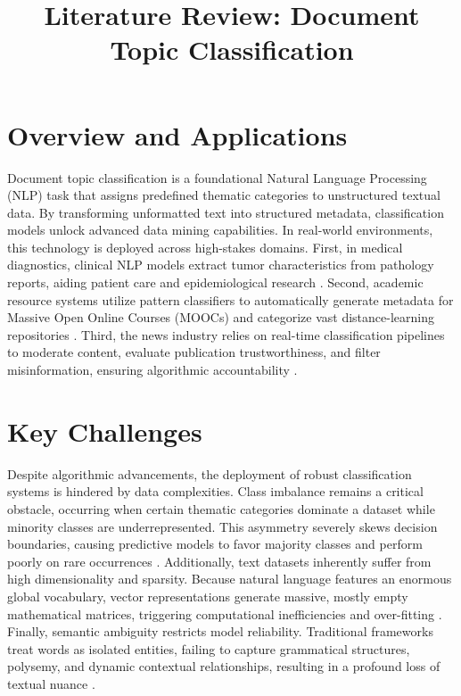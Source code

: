 \documentclass[11pt,a4paper]{article}
\title{Literature Review: Document Topic Classification}
\author{}
\date{}
\begin{document}
\maketitle

\section*{Overview and Applications}

Document topic classification is a foundational Natural Language Processing (NLP) task that assigns predefined thematic categories to unstructured textual data. By transforming unformatted text into structured metadata, classification models unlock advanced data mining capabilities. In real-world environments, this technology is deployed across high-stakes domains. First, in medical diagnostics, clinical NLP models extract tumor characteristics from pathology reports, aiding patient care and epidemiological research \citep{demner2021natural}. Second, academic resource systems utilize pattern classifiers to automatically generate metadata for Massive Open Online Courses (MOOCs) and categorize vast distance-learning repositories \citep{sebbaq2022fine}. Third, the news industry relies on real-time classification pipelines to moderate content, evaluate publication trustworthiness, and filter misinformation, ensuring algorithmic accountability \citep{shu2017fake}.

\section*{Key Challenges}

Despite algorithmic advancements, the deployment of robust classification systems is hindered by data complexities. Class imbalance remains a critical obstacle, occurring when certain thematic categories dominate a dataset while minority classes are underrepresented. This asymmetry severely skews decision boundaries, causing predictive models to favor majority classes and perform poorly on rare occurrences \citep{karaman2026similarity}. Additionally, text datasets inherently suffer from high dimensionality and sparsity. Because natural language features an enormous global vocabulary, vector representations generate massive, mostly empty mathematical matrices, triggering computational inefficiencies and over-fitting \citep{joachims1998text}. Finally, semantic ambiguity restricts model reliability. Traditional frameworks treat words as isolated entities, failing to capture grammatical structures, polysemy, and dynamic contextual relationships, resulting in a profound loss of textual nuance \citep{devlin2019bert}.
\end{document}
